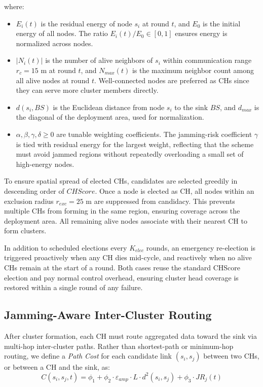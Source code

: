 \documentclass[conference]{IEEEtran}
\begin{document}
where:
\begin{itemize}
    \item $E_i(t)$ is the residual energy of node $s_i$ at round $t$,
    and $E_0$ is the initial energy of all nodes. The ratio
    $E_i(t)/E_0 \in [0,1]$ ensures energy is normalized across nodes.
    \item $|N_i(t)|$ is the number of alive neighbors of $s_i$ within
    communication range $r_c = 15$ m at round $t$, and $N_{max}(t)$ is
    the maximum neighbor count among all alive nodes at round $t$.
    Well-connected nodes are preferred as CHs since they can serve more
    cluster members directly.
    \item $d(s_i, BS)$ is the Euclidean distance from node $s_i$ to the
    sink $BS$, and $d_{max}$ is the diagonal of the deployment area,
    used for normalization.
    \item $\alpha, \beta, \gamma, \delta \geq 0$ are tunable weighting
    coefficients. The jamming-risk coefficient $\gamma$ is tied with
    residual energy for the largest weight, reflecting that the scheme
    must avoid jammed regions without repeatedly overloading a small
    set of high-energy nodes.
\end{itemize}

To ensure spatial spread of elected CHs, candidates are selected greedily
in descending order of $CHScore$. Once a node is elected as CH, all nodes
within an exclusion radius $r_{exc} = 25$ m are suppressed from
candidacy. This prevents multiple CHs from forming in the same region,
ensuring coverage across the deployment area. All remaining alive nodes
associate with their nearest CH to form clusters.

In addition to scheduled elections every $K_{elec}$ rounds, an emergency
re-election is triggered proactively when any CH dies mid-cycle, and
reactively when no alive CHs remain at the start of a round. Both cases
reuse the standard CHScore election and pay normal control overhead,
ensuring cluster head coverage is restored within a single round of
any failure.

\subsection{Jamming-Aware Inter-Cluster Routing}

After cluster formation, each CH must route aggregated data toward the
sink via multi-hop inter-cluster paths. Rather than shortest-path or
minimum-hop routing, we define a \textit{Path Cost} for each candidate
link $(s_i, s_j)$ between two CHs, or between a CH and the sink, as:
\begin{equation}
    C(s_i, s_j, t) = \phi_1 + \phi_2 \cdot \varepsilon_{amp}
    \cdot L \cdot d^2(s_i, s_j) + \phi_3 \cdot JR_j(t)
\end{equation}
\end{document}
